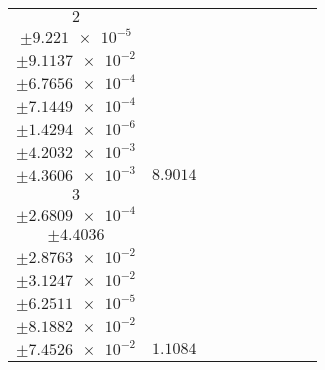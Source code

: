 \documentclass[8pt]{article}
\begin{document}
\begin{longtable}[l]{c c c c c c c c c}
$\num{2}$ & \begin{tabular}[c]{@{}c@{}}$\num{5.9573e-2}$ \\ $\pm\num{9.221e-5}$\end{tabular} & \begin{tabular}[c]{@{}c@{}}$\num{-1.5789}$ \\ $\pm\num{9.1137e-2}$\end{tabular} & \begin{tabular}[c]{@{}c@{}}$\num{-6.9964}$ \\ $\pm\num{6.7656e-4}$\end{tabular} & \begin{tabular}[c]{@{}c@{}}$\num{1.5588e+3}$ \\ $\pm\num{7.1449e-4}$\end{tabular} & \begin{tabular}[c]{@{}c@{}}$\num{3.1185}$ \\ $\pm\num{1.4294e-6}$\end{tabular} & \begin{tabular}[c]{@{}c@{}}$\num{2.4235}$ \\ $\pm\num{4.2032e-3}$\end{tabular} & \begin{tabular}[c]{@{}c@{}}$\num{2.4845}$ \\ $\pm\num{4.3606e-3}$\end{tabular} & $\num{8.9014}$\\
$\num{3}$ & \begin{tabular}[c]{@{}c@{}}$\num{8.1191e-3}$ \\ $\pm\num{2.6809e-4}$\end{tabular} & \begin{tabular}[c]{@{}c@{}}$\num{0.18827}$ \\ $\pm\num{4.4036}$\end{tabular} & \begin{tabular}[c]{@{}c@{}}$\num{-5.4569}$ \\ $\pm\num{2.8763e-2}$\end{tabular} & \begin{tabular}[c]{@{}c@{}}$\num{1.5691e+3}$ \\ $\pm\num{3.1247e-2}$\end{tabular} & \begin{tabular}[c]{@{}c@{}}$\num{3.139}$ \\ $\pm\num{6.2511e-5}$\end{tabular} & \begin{tabular}[c]{@{}c@{}}$\num{3.4827}$ \\ $\pm\num{8.1882e-2}$\end{tabular} & \begin{tabular}[c]{@{}c@{}}$\num{3.2777}$ \\ $\pm\num{7.4526e-2}$\end{tabular} & $\num{1.1084}$\\

\end{longtable}
\end{document}
